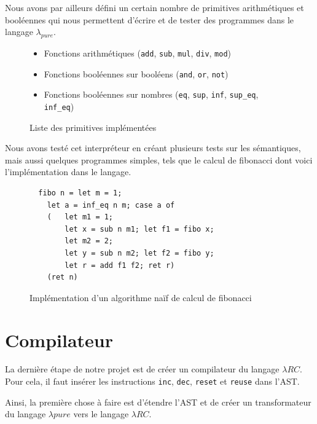 \documentclass{rapportECL}
\begin{document}
\bigskip

Nous avons par ailleurs défini un certain nombre de primitives arithmétiques et booléennes qui nous permettent d'écrire et 
de tester des programmes dans le langage $\lambda_{pure}$.

\begin{figure}[H]
	\begin{itemize}
		\item Fonctions arithmétiques (\verb|add|, \verb|sub|, \verb|mul|, \verb|div|, \verb|mod|)
		\item Fonctions booléennes sur booléens (\verb|and|, \verb|or|, \verb|not|)
		\item Fonctions booléennes sur nombres (\verb|eq|, \verb|sup|, \verb|inf|, \verb|sup_eq|, \verb|inf_eq|)
	\end{itemize}
	\label{primitives}
	\caption{Liste des primitives implémentées}
\end{figure}

\bigskip

Nous avons testé cet interpréteur en créant plusieurs tests sur les sémantiques, mais aussi quelques programmes simples, 
tels que le calcul de fibonacci dont voici l'implémentation dans le langage.

\begin{figure}[H]
	\begin{lstlisting}
  fibo n = let m = 1;
    let a = inf_eq n m; case a of
    (   let m1 = 1;
        let x = sub n m1; let f1 = fibo x;
        let m2 = 2;
        let y = sub n m2; let f2 = fibo y;
        let r = add f1 f2; ret r)
    (ret n)
	\end{lstlisting}
	\caption{Implémentation d'un algorithme naïf de calcul de fibonacci}
	\label{listing:fibo_naif}
\end{figure}
\FloatBarrier 

\section{Compilateur}

La dernière étape de notre projet est de créer un compilateur du langage $\lambda{RC}$. Pour cela, il faut insérer les 
instructions \verb|inc|, \verb|dec|, \verb|reset| et \verb|reuse| dans l'AST. 

Ainsi, la première chose à faire est
d'étendre l'AST et de créer un transformateur du langage $\lambda{pure}$ vers le langage $\lambda{RC}$.
\end{document}

